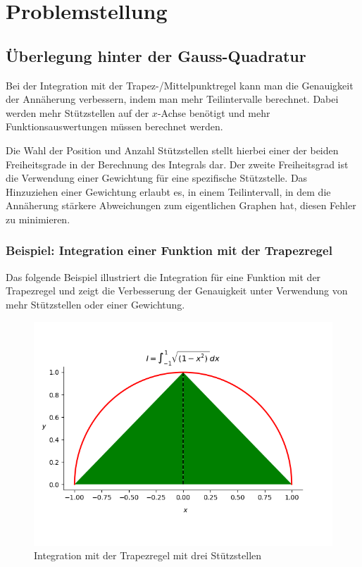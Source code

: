 %
%
%
\section{Problemstellung
\label{quadratur:section:problemstellung}}
\subsection{Überlegung hinter der Gauss-Quadratur \label{quadratur:subsection:ueberlegung}}

Bei der Integration mit der Trapez-/Mittelpunktregel kann man die Genauigkeit
der Annäherung verbessern, indem man mehr Teilintervalle berechnet.
Dabei werden mehr Stützstellen auf der $x$-Achse benötigt und mehr Funktionsauswertungen
müssen berechnet werden.

\noindent
Die Wahl der Position und Anzahl Stützstellen stellt hierbei einer der beiden Freiheitsgrade
in der Berechnung des Integrals dar.
Der zweite Freiheitsgrad ist die Verwendung einer Gewichtung für eine spezifische Stützstelle.
Das Hinzuziehen einer Gewichtung erlaubt es, in einem Teilintervall, 
in dem die Annäherung stärkere Abweichungen zum eigentlichen Graphen hat, 
diesen Fehler zu minimieren. 


\subsubsection{Beispiel: Integration einer Funktion mit der Trapezregel}
Das folgende Beispiel illustriert die Integration für eine Funktion mit der Trapezregel und
zeigt die Verbesserung der Genauigkeit unter Verwendung von mehr Stützstellen oder einer Gewichtung.

\begin{figure}[!h]
    \centering
    \includegraphics[scale=0.6]{papers/quadratur/figures/GaussTrapez1}
    \caption{Integration mit der Trapezregel mit drei Stützstellen
    \label{quadratur:figure:trapez1}} 
\end{figure}

